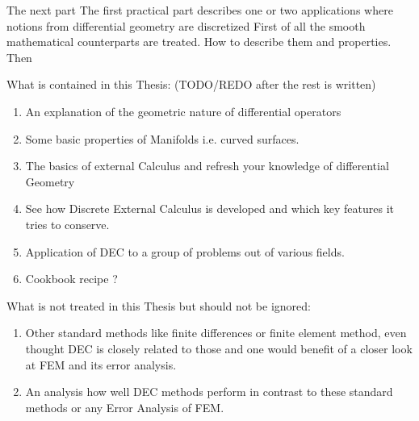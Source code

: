 The next part 
The first practical part describes one or two applications where notions from differential geometry are discretized
First of all the smooth mathematical counterparts are treated. How to describe them and properties. Then 

What is contained in this Thesis: (TODO/REDO after the rest is written)
\begin{enumerate}
\item An explanation of the geometric nature of differential operators
\item Some basic properties of Manifolds i.e. curved surfaces.
\item The basics of external Calculus and refresh your knowledge of differential Geometry 
\item See how Discrete External Calculus is developed and which key features it tries to conserve.
\item Application of DEC to a group of problems out of various fields.
\item Cookbook recipe ?
\end{enumerate}
What is not treated in this Thesis but should not be ignored:
\begin{enumerate}
\item Other standard methods like finite differences or finite element method, even thought DEC is closely related to those and one would benefit of a closer look at FEM and its error analysis.
\item An analysis how well DEC methods perform in contrast to these standard methods or any Error Analysis of FEM.
\end{enumerate}